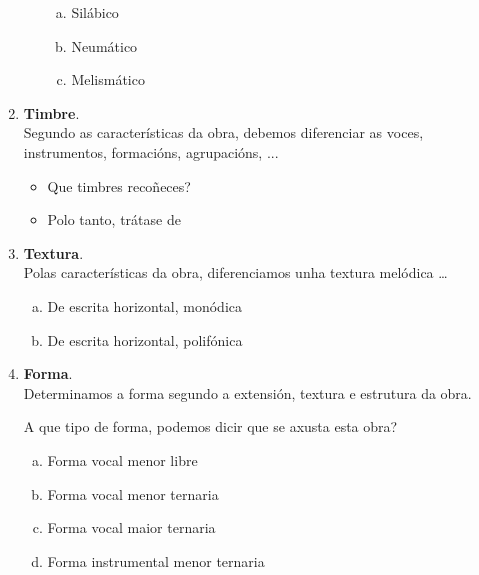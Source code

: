\begin{multicols}{2}
\begin{enumerate}[1.-]
\begin{itemize}
\begin{enumerate}[a)]
                  \item
                  Silábico \dotfill
                  \item
                  Neumático \dotfill
                  \item
                  Melismático \dotfill
                \end{enumerate}
        \end{itemize}
        \item %
        \textbf{Timbre}. \\
        Segundo as características da obra, debemos diferenciar as voces, instrumentos, formacións, agrupacións, ...
            \begin{itemize}
                \item 
                Que timbres recoñeces? \dotfill
                \item
                Polo tanto, trátase de \dotfill
            \end{itemize}
        \item %
        \textbf{Textura}. \\
        Polas características da obra, diferenciamos unha textura melódica \ldots 
            \begin{enumerate}[a)]
                \item 
                De escrita horizontal, monódica
                \item 
                De escrita horizontal, polifónica
            \end{enumerate}
        \item %
        \textbf{Forma}. \\
        Determinamos a forma segundo a extensión, textura e estrutura da obra. \\ 
        \par %
        A que tipo de forma, podemos dicir que se axusta esta obra?
        \begin{enumerate}[a)]
            \item 
            Forma vocal menor libre
            \item
            Forma vocal menor ternaria
            \item
            Forma vocal maior ternaria
            \item
            Forma instrumental menor ternaria
        \end{enumerate}
        \end{enumerate}
%
\end{multicols}
%
